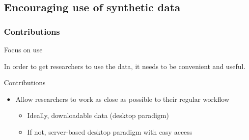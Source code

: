\begin{frame}
\end{frame}






























\subsection[Use]{Encouraging use of synthetic data}

\begin{frame}
\mytitlepage{\insertsubsection}
\end{frame}


\begin{frame}
\frametitle{Contributions}
\begin{block}{
Focus on use}
In order to get researchers to use the data, it needs to be convenient and useful.
\end{block}
\pause
\begin{block}{Contributions}
\begin{itemize}[<+->]
	\item Allow researchers to work as close as possible to their regular workflow

		\begin{itemize}[<+->]
		\item Ideally, downloadable data (desktop paradigm)
		\item If not, server-based desktop paradigm with easy access 
		\end{itemize}

\end{itemize}
\end{block}

\end{frame}


